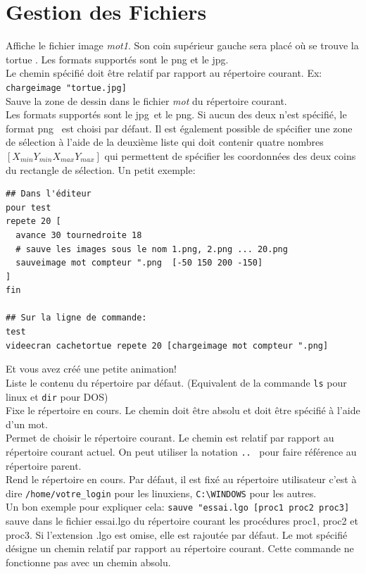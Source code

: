 \section{Gestion des Fichiers}
\noindent
{}
Affiche le fichier image \textit{mot1}. Son coin supérieur gauche sera placé où se trouve la tortue . Les formats supportés sont le png et le jpg. \\
Le chemin spécifié doit être relatif par rapport au répertoire courant. Ex: \texttt{chargeimage "tortue.jpg]} \\
Sauve la zone de dessin dans le fichier \textit{mot} du répertoire courant.\\
Les formats supportés sont le \og jpg\fg\ et le \og png\fg. Si aucun des deux n'est spécifié, le format \og png \fg\ est choisi par défaut. Il est également possible de spécifier une zone de sélection à l'aide de la deuxième liste qui doit contenir quatre nombres $[X_{min} Y_{min} X_{max} Y_{max}]$ qui permettent de spécifier les coordonnées des deux coins du rectangle de sélection. Un petit exemple:
\begin{verbatim}
## Dans l'éditeur
pour test
repete 20 [
  avance 30 tournedroite 18
  # sauve les images sous le nom 1.png, 2.png ... 20.png
  sauveimage mot compteur ".png  [-50 150 200 -150]
]
fin 

## Sur la ligne de commande:
test
videecran cachetortue repete 20 [chargeimage mot compteur ".png] 
\end{verbatim}
Et vous avez créé une petite animation!\\
Liste le contenu du répertoire par défaut. (Equivalent de la commande \texttt{ls} pour linux et \texttt{dir} pour DOS)\\
 Fixe le répertoire en cours. Le chemin doit être absolu et doit être spécifié à l'aide d'un mot.\\
 Permet de choisir le répertoire courant. Le chemin est relatif par rapport au répertoire courant actuel. On peut utiliser la notation \og \texttt{..} \fg \ pour faire référence au répertoire parent.\\
 Rend le répertoire en cours. Par défaut, il est fixé au répertoire utilisateur c'est à dire \texttt{/home/votre\_login} pour les linuxiens, \texttt{C:\textbackslash WINDOWS} pour les autres.\\
Un bon exemple pour expliquer cela:
\texttt{sauve "essai.lgo [proc1 proc2 proc3]} sauve dans le fichier essai.lgo du répertoire courant les procédures proc1, proc2 et proc3. Si l'extension .lgo est omise, elle est rajoutée par défaut. Le mot spécifié désigne un chemin relatif par rapport au répertoire courant. Cette commande ne fonctionne pas avec un chemin absolu.\\

